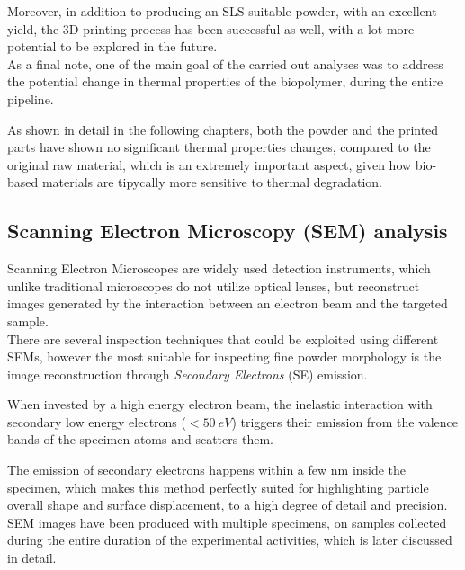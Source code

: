 \documentclass[a4paper]{article}
\begin{document}
    Moreover, in addition to producing an SLS suitable powder, with an excellent yield, the 3D printing process has been successful as well, with 
    a lot more potential to be explored in the future. \\ 

    As a final note, one of the main goal of the carried out analyses was to address the potential change in thermal properties of the biopolymer, during the entire pipeline. 
    
    As shown in detail in the following chapters, both the powder and the printed parts have shown no significant thermal properties changes, compared to the 
    original raw material, which is an extremely important aspect, given how bio-based materials are tipycally more sensitive to thermal degradation. \\ 


    \clearpage
        \subsection{Scanning Electron Microscopy (SEM) analysis\label{SEM_analysis}}

        Scanning Electron Microscopes are widely used detection instruments, which unlike traditional microscopes 
        do not utilize optical lenses, but reconstruct images generated by the interaction between an electron beam and the targeted 
        sample. \\ 

        There are several inspection techniques that could be exploited using different SEMs, however the most suitable for inspecting 
        fine powder morphology is the image reconstruction through \textit{Secondary Electrons} (SE) emission. 

        When invested by a high energy electron beam, the inelastic interaction with secondary low energy electrons ($< 50 \ eV$) triggers their emission from the valence bands of the specimen atoms and scatters them. 

        The emission of secondary electrons happens within a few nm inside the specimen, which makes this method perfectly suited 
        for highlighting particle overall shape and surface displacement, to a high degree of detail and precision. \\

        SEM images have been produced with multiple specimens, on samples collected during the entire duration of the experimental 
        activities, which is later discussed in detail. 
\end{document}
